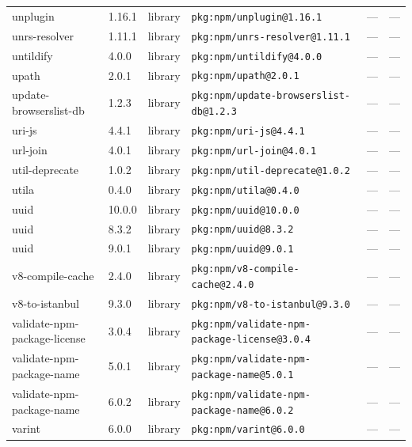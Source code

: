 \documentclass[11pt,a4paper]{article}
\begin{document}
\begin{longtable}{|p{4cm}|p{2cm}|p{1.6cm}|p{5cm}|p{1.5cm}|p{3.5cm}|}
\raggedright unplugin & 1.16.1 & library & \small\texttt{pkg:npm/unplugin@1.16.1} & — & \small — \\
\raggedright unrs-resolver & 1.11.1 & library & \small\texttt{pkg:npm/unrs-resolver@1.11.1} & — & \small — \\
\raggedright untildify & 4.0.0 & library & \small\texttt{pkg:npm/untildify@4.0.0} & — & \small — \\
\raggedright upath & 2.0.1 & library & \small\texttt{pkg:npm/upath@2.0.1} & — & \small — \\
\raggedright update-browserslist-db & 1.2.3 & library & \small\texttt{pkg:npm/update-browserslist-db@1.2.3} & — & \small — \\
\raggedright uri-js & 4.4.1 & library & \small\texttt{pkg:npm/uri-js@4.4.1} & — & \small — \\
\raggedright url-join & 4.0.1 & library & \small\texttt{pkg:npm/url-join@4.0.1} & — & \small — \\
\raggedright util-deprecate & 1.0.2 & library & \small\texttt{pkg:npm/util-deprecate@1.0.2} & — & \small — \\
\raggedright utila & 0.4.0 & library & \small\texttt{pkg:npm/utila@0.4.0} & — & \small — \\
\raggedright uuid & 10.0.0 & library & \small\texttt{pkg:npm/uuid@10.0.0} & — & \small — \\
\raggedright uuid & 8.3.2 & library & \small\texttt{pkg:npm/uuid@8.3.2} & — & \small — \\
\raggedright uuid & 9.0.1 & library & \small\texttt{pkg:npm/uuid@9.0.1} & — & \small — \\
\raggedright v8-compile-cache & 2.4.0 & library & \small\texttt{pkg:npm/v8-compile-cache@2.4.0} & — & \small — \\
\raggedright v8-to-istanbul & 9.3.0 & library & \small\texttt{pkg:npm/v8-to-istanbul@9.3.0} & — & \small — \\
\raggedright validate-npm-package-license & 3.0.4 & library & \small\texttt{pkg:npm/validate-npm-package-license@3.0.4} & — & \small — \\
\raggedright validate-npm-package-name & 5.0.1 & library & \small\texttt{pkg:npm/validate-npm-package-name@5.0.1} & — & \small — \\
\raggedright validate-npm-package-name & 6.0.2 & library & \small\texttt{pkg:npm/validate-npm-package-name@6.0.2} & — & \small — \\
\raggedright varint & 6.0.0 & library & \small\texttt{pkg:npm/varint@6.0.0} & — & \small — \\

\end{longtable}
\end{document}
